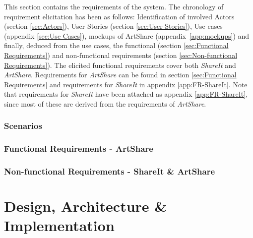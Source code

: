 \documentclass{report}
\begin{document}



This section contains the requirements of the system. The chronology of requirement elicitation has been as follows: Identification of involved Actors (section \ref{sec:Actors}), User Stories (section \ref{sec:User Stories}), Use cases (appendix \ref{sec:Use Cases}), mockups of ArtShare (appendix~\ref{app:mockups}) and finally, deduced from the use cases, the functional (section \ref{sec:Functional Requirements}) and non-functional requirements (section \ref{sec:Non-functional Requirements}). The elicited functional requirements cover both \textit{ShareIt} and \textit{ArtShare}. Requirements for \textit{ArtShare} can be found in section \ref{sec:Functional Requirements} and requirements for \textit{ShareIt} in appendix \ref{app:FR-ShareIt}. Note that requirements for \textit{ShareIt} have been attached as appendix \ref{app:FR-ShareIt}, since most of these are derived from the requirements of \textit{ArtShare}.


\newpage
\subsection{Scenarios}



\FloatBarrier
\subsection{Functional Requirements - ArtShare}


\subsection{Non-functional Requirements -  ShareIt \& ArtShare}


\chapter{Design, Architecture \& \\Implementation}
\end{document}
